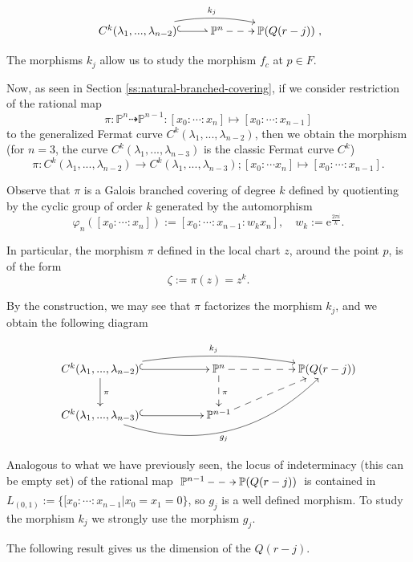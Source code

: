 \documentclass{amsart}
\newcommand{\C}[3]{\ensuremath{C^{#1}(#3_1,...,#3_{#2})}}
\begin{document}
$$\xymatrix{ \C{k}{n-2}{\lambda} \ar@^{(->}[r] \ar@/^1pc/[rr]^{k_j}&{\mathbb{P}}^{n}\ar@{-->}[r]&{\mathbb{P}}(Q(r-j))},$$
 
The  morphisms  $k_j$ allow us to study the morphism $f_c$ at $p\in F$.
 
Now, as seen in Section \ref{ss:natural-branched-covering}, if we consider restriction of the rational map  
$$\pi: {\mathbb{P}}^{n} \dashrightarrow {\mathbb{P}}^{n-1}: [x_0:\cdots:x_n] \mapsto [x_0:\cdots:x_{n-1}]$$
to the generalized Fermat curve $\C{k}{n-2}{\lambda}$, then we obtain the morphism  (for $n=3 $, 
the curve $\C{k}{n-3}{\lambda}$ is the classic Fermat curve $C^k$)
$$\pi:\C{k}{n-2}{\lambda}\rightarrow \C{k}{n-3}{\lambda};[x_0:\cdots x_n]\mapsto [x_0:\cdots:x_{n-1}].$$

Observe that $\pi$ is a Galois branched covering of degree $k$ defined by quotienting 
by the cyclic group of order $k$ generated by the automorphism 
$$\varphi_n([x_0:\cdots:x_n]):=[x_0:\cdots:x_{n-1}:w_kx_n], \quad w_k:={\mathrm{e}}^{\frac{2\pi i}{k}}.$$

In particular, the morphism $\pi$ defined in the local chart $z$, around the point $p$, is of the form  
$$\zeta:=\pi(z)=z^{k}.$$


By the construction, we may see that $\pi$ factorizes the morphism $k_j$, and we obtain the following diagram

\begin{equation}\label{diagrama2}
\xymatrix{ \C{k}{n-2}{\lambda} \ar[d]^{\pi}  \ar@{^{(}->}[rr] \ar@/^1pc/[rrrr]^{k_j}  & & 
{\mathbb{P}}^{n}\ar@{-->}[d]^{\pi} 
\ar@{-->}[rr]&& {\mathbb{P}}(Q(r-j)) \\
\C{k}{n-3}{\lambda} \ar@{^{(}->}[rr]\ar@/_3pc/[rrrru]_{g_j} & &{\mathbb{P}}^{n-1}\ar@{-->}[rru]&&}
\end{equation}

Analogous to what we have previously seen, the locus of indeterminacy (this can be empty set) of the rational map
  $\xymatrix{{\mathbb{P}}^{n-1}\ar@{-->}[r] &{\mathbb{P}}(Q(r-j))}$
 is contained in $L_{(0,1)}:=\{[x_0:\cdots:x_{n-1}
|x_0=x_1=0\}$,  so $g_j$ is a well defined morphism.
 To study the morphism $k_j$ we strongly use the morphism $g_j$.
 
The following result gives us the dimension of the $Q(r-j)$.  
\end{document}
